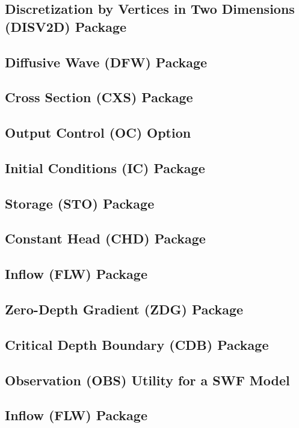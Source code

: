\newpage
\subsection{Discretization by Vertices in Two Dimensions (DISV2D) Package}


\newpage
\subsection{Diffusive Wave (DFW) Package}


\newpage
\subsection{Cross Section (CXS) Package}


\newpage
\subsection{Output Control (OC) Option}


\newpage
\subsection{Initial Conditions (IC) Package}


\newpage
\subsection{Storage (STO) Package}


\newpage
\subsection{Constant Head (CHD) Package}


\newpage
\subsection{Inflow (FLW) Package}


\newpage
\subsection{Zero-Depth Gradient (ZDG) Package}


\newpage
\subsection{Critical Depth Boundary (CDB) Package}


\newpage
\subsection{Observation (OBS) Utility for a SWF Model}


\newpage
\subsection{Inflow (FLW) Package}



